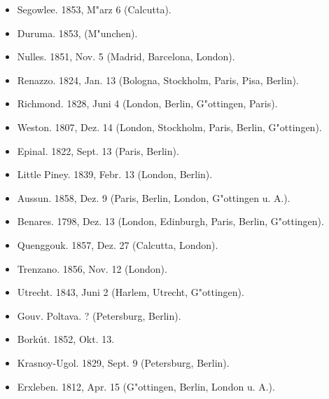 \documentclass[a4paper, 11pt, oneside]{article}
\begin{document}
\begin{itemize}
\begin{itemize}
\begin{itemize}
            \item Segowlee. 1853, M"arz 6 (Calcutta).
            
            \item Duruma. 1853, (M"unchen).
        
            \item Nulles. 1851, Nov. 5 (Madrid, Barcelona, London).
        
            \item Renazzo. 1824, Jan. 13 (Bologna, Stockholm, Paris, Pisa, Berlin).
        
            \item Richmond. 1828, Juni 4 (London, Berlin, G"ottingen, Paris).
        
            \item Weston. 1807, Dez. 14 (London, Stockholm, Paris, Berlin, G"ottingen).
            
            \item Epinal. 1822, Sept. 13 (Paris, Berlin).
        
            \item Little Piney. 1839, Febr. 13 (London, Berlin).
        
            \item Aussun. 1858, Dez. 9 (Paris, Berlin, London, G"ottingen u. A.).
        
            \item Benares. 1798, Dez. 13 (London, Edinburgh, Paris, Berlin, G"ottingen).
        
            \item Quenggouk. 1857, Dez. 27 (Calcutta, London).
        
            \item Trenzano. 1856, Nov. 12 (London).
        
            \item Utrecht. 1843, Juni 2 (Harlem, Utrecht, G"ottingen).
        
            \item Gouv. Poltava. ? (Petersburg, Berlin).
        
            \item Borkút. 1852, Okt. 13.
        
            \item Krasnoy-Ugol. 1829, Sept. 9 (Petersburg, Berlin).
        
            \item Erxleben. 1812, Apr. 15 (G"ottingen, Berlin, London u. A.).
        

\end{itemize}
\end{itemize}
\end{itemize}
\end{document}
